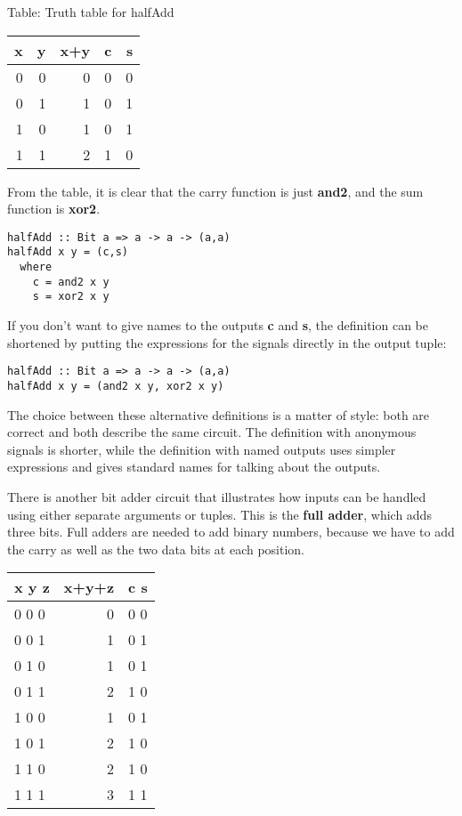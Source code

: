\documentclass[11pt]{article}
\begin{document}
Table: Truth table for halfAdd

\begin{center}
\begin{tabular}{rrrrr}
x & y & x+y & c & s\\[0pt]
\hline
0 & 0 & 0 & 0 & 0\\[0pt]
0 & 1 & 1 & 0 & 1\\[0pt]
1 & 0 & 1 & 0 & 1\\[0pt]
1 & 1 & 2 & 1 & 0\\[0pt]
\end{tabular}
\end{center}

From the table, it is clear that the carry function is just \textbf{and2},
and the sum function is \textbf{xor2}.


\begin{verbatim}
halfAdd :: Bit a => a -> a -> (a,a)
halfAdd x y = (c,s)
  where
    c = and2 x y
    s = xor2 x y
\end{verbatim}


If you don't want to give names to the outputs \textbf{c} and \textbf{s}, the
definition can be shortened by putting the expressions for the signals
directly in the output tuple:


\begin{verbatim}
halfAdd :: Bit a => a -> a -> (a,a)
halfAdd x y = (and2 x y, xor2 x y)
\end{verbatim}


The choice between these alternative definitions is a matter of style:
both are correct and both describe the same circuit.  The definition
with anonymous signals is shorter, while the definition with named
outputs uses simpler expressions and gives standard names for talking
about the outputs.

There is another bit adder circuit that illustrates how inputs can be
handled using either separate arguments or tuples.  This is the \textbf{full
adder}, which adds three bits.  Full adders are needed to add binary
numbers, because we have to add the carry as well as the two data bits
at each position.

\begin{center}
\begin{tabular}{lrl}
x  y  z & x+y+z & c  s\\[0pt]
\hline
0  0  0 & 0 & 0  0\\[0pt]
0  0  1 & 1 & 0  1\\[0pt]
0  1  0 & 1 & 0  1\\[0pt]
0  1  1 & 2 & 1  0\\[0pt]
1  0  0 & 1 & 0  1\\[0pt]
1  0  1 & 2 & 1  0\\[0pt]
1  1  0 & 2 & 1  0\\[0pt]
1  1  1 & 3 & 1  1\\[0pt]
\end{tabular}
\end{center}
\end{document}
